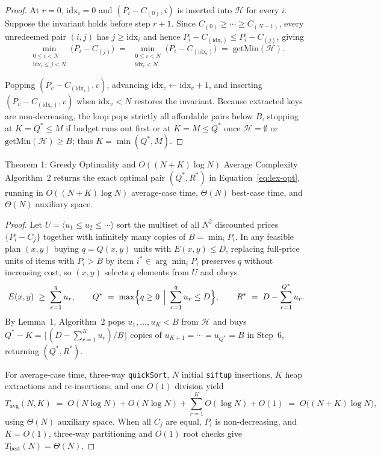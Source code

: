 \documentclass[10pt, a4paper]{article}
\newcommand{\code}[1]{\texttt{\color{primary!90!black}#1}}
\newcommand{\id}[1]{\ensuremath{\mathrm{#1}}}
\begin{document}
\begin{proof}
At $r = 0$, $\id{idx}_i = 0$ and $(P_i - C_{(0)}, i)$ is inserted into $\mathcal{H}$ for every $i$. Suppose the invariant holds before step $r + 1$. Since $C_{(0)} \ge \cdots \ge C_{(N-1)}$, every unredeemed pair $(i, j)$ has $j \ge \id{idx}_i$ and hence $P_i - C_{(\id{idx}_i)} \le P_i - C_{(j)}$, giving
\[
  \min_{\substack{0 \le i < N \\ \id{idx}_i \le j < N}} \bigl(P_i - C_{(j)}\bigr)
  \;=\; \min_{\substack{0 \le i < N \\ \id{idx}_i < N}} \bigl(P_i - C_{(\id{idx}_i)}\bigr)
  \;=\; \id{getMin}(\mathcal{H}).
\]

Popping $(P_v - C_{(\id{idx}_v)}, v)$, advancing $\id{idx}_v \gets \id{idx}_v + 1$, and inserting $(P_v - C_{(\id{idx}_v)}, v)$ when $\id{idx}_v < N$ restores the invariant. Because extracted keys are non-decreasing, the loop pops strictly all affordable pairs below $B$, stopping at $K = Q^* \le M$ if budget runs out first or at $K = M \le Q^*$ once $\mathcal{H} = \emptyset$ or $\id{getMin}(\mathcal{H}) \ge B$; thus $K = \min(Q^*, M)$.
\end{proof}

\begin{theorembx}{Theorem 1: Greedy Optimality and $O((N + K)\log N)$ Average Complexity}
Algorithm~2 returns the exact optimal pair $(Q^*, R^*)$ in Equation~\ref{eq:lex-opt}, running in $O((N + K)\log N)$ average-case time, $\Theta(N)$ best-case time, and $\Theta(N)$ auxiliary space.
\end{theorembx}

\begin{proof}
Let $U = \langle u_1 \le u_2 \le \cdots \rangle$ sort the multiset of all $N^2$ discounted prices $\{P_i - C_j\}$ together with infinitely many copies of $B = \min_i P_i$. In any feasible plan $(x, y)$ buying $q = Q(x, y)$ units with $E(x, y) \le D$, replacing full-price units of items with $P_i > B$ by item $i^* \in \arg\min_i P_i$ preserves $q$ without increasing cost, so $(x, y)$ selects $q$ elements from $U$ and obeys
\[
  E(x, y) \;\ge\; \sum_{r=1}^{q} u_r, \qquad
  Q^* \;=\; \max\Bigl\{ q \ge 0 \,\Bigm|\, \sum_{r=1}^{q} u_r \le D \Bigr\}, \qquad
  R^* \;=\; D - \sum_{r=1}^{Q^*} u_r.
\]
By Lemma~1, Algorithm~2 pops $u_1, \ldots, u_K < B$ from $\mathcal{H}$ and buys $Q^* - K = \bigl\lfloor (D - \sum_{r=1}^{K} u_r)/B \bigr\rfloor$ copies of $u_{K+1} = \cdots = u_{Q^*} = B$ in Step~6, returning $(Q^*, R^*)$.

For average-case time, three-way \code{quickSort}, $N$ initial \code{siftup} insertions, $K$ heap extractions and re-insertions, and one $O(1)$ division yield
\[
  T_{\text{avg}}(N, K) \;=\; O(N \log N) + O(N \log N) + \sum_{r=1}^{K} O(\log N) + O(1) \;=\; O\bigl((N + K)\log N\bigr),
\]
using $\Theta(N)$ auxiliary space. When all $C_j$ are equal, $P_i$ is non-decreasing, and $K = O(1)$, three-way partitioning and $O(1)$ root checks give $T_{\text{best}}(N) = \Theta(N)$.
\end{proof}
\end{document}

